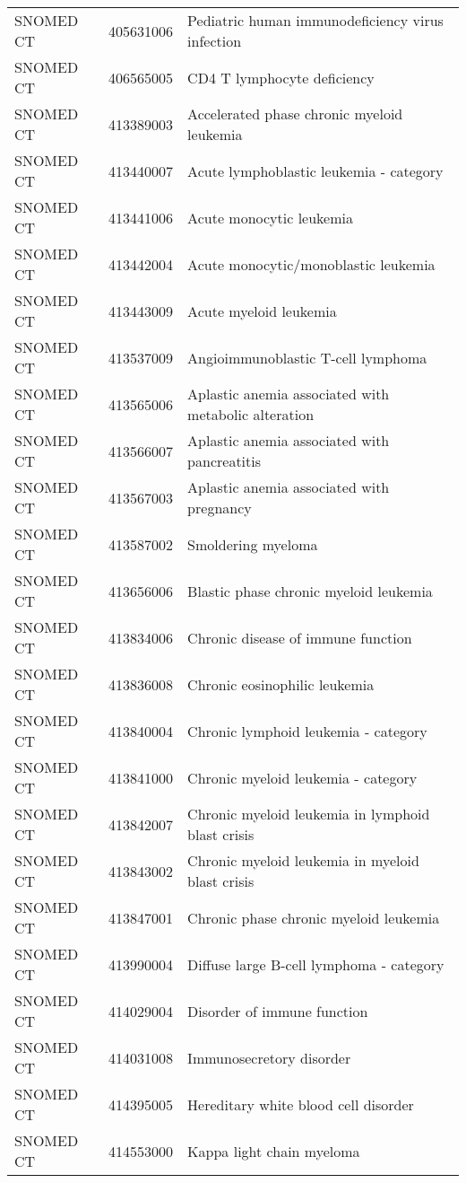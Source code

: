 \begin{longtable}{p{}p{}p{}}
  SNOMED CT & 405631006 & Pediatric human immunodeficiency virus infection \\ 
  SNOMED CT & 406565005 & CD4 T lymphocyte deficiency \\ 
  SNOMED CT & 413389003 & Accelerated phase chronic myeloid leukemia \\ 
  SNOMED CT & 413440007 & Acute lymphoblastic leukemia - category \\ 
  SNOMED CT & 413441006 & Acute monocytic leukemia \\ 
  SNOMED CT & 413442004 & Acute monocytic/monoblastic leukemia \\ 
  SNOMED CT & 413443009 & Acute myeloid leukemia \\ 
  SNOMED CT & 413537009 & Angioimmunoblastic T-cell lymphoma \\ 
  SNOMED CT & 413565006 & Aplastic anemia associated with metabolic alteration \\ 
  SNOMED CT & 413566007 & Aplastic anemia associated with pancreatitis \\ 
  SNOMED CT & 413567003 & Aplastic anemia associated with pregnancy \\ 
  SNOMED CT & 413587002 & Smoldering myeloma \\ 
  SNOMED CT & 413656006 & Blastic phase chronic myeloid leukemia \\ 
  SNOMED CT & 413834006 & Chronic disease of immune function \\ 
  SNOMED CT & 413836008 & Chronic eosinophilic leukemia \\ 
  SNOMED CT & 413840004 & Chronic lymphoid leukemia - category \\ 
  SNOMED CT & 413841000 & Chronic myeloid leukemia - category \\ 
  SNOMED CT & 413842007 & Chronic myeloid leukemia in lymphoid blast crisis \\ 
  SNOMED CT & 413843002 & Chronic myeloid leukemia in myeloid blast crisis \\ 
  SNOMED CT & 413847001 & Chronic phase chronic myeloid leukemia \\ 
  SNOMED CT & 413990004 & Diffuse large B-cell lymphoma - category \\ 
  SNOMED CT & 414029004 & Disorder of immune function \\ 
  SNOMED CT & 414031008 & Immunosecretory disorder \\ 
  SNOMED CT & 414395005 & Hereditary white blood cell disorder \\ 
  SNOMED CT & 414553000 & Kappa light chain myeloma \\ 

\end{longtable}
